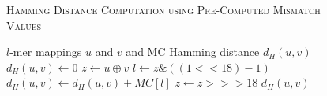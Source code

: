 \begin{figure}[h]
	\noindent \hspace*{6pt}{\bf Algorithm 4} \textsc{Hamming Distance Computation using Pre-Computed Mismatch Values}
	\begin{algorithmic}[1]
		\label{alg:upd-hamming-distance-comp}
		\Require $l$-mer mappings $u$ and $v$ and\newline
			\hspace*{8pt} MC 
		\Ensure Hamming distance $d_H(u,v)$ \vspace*{6pt}
		\State $d_H(u, v) \leftarrow 0$
		\State $z \leftarrow u \oplus v$
			\State $l \leftarrow z \& ((1 << 18) - 1)$
			\State $d_H(u, v) \leftarrow d_H(u, v) + MC[l]$ 
			\State $z \leftarrow z >>> 18$ 
		\EndWhile
		\State\Return $d_H(u, v)$
	\end{algorithmic}
\end{figure}